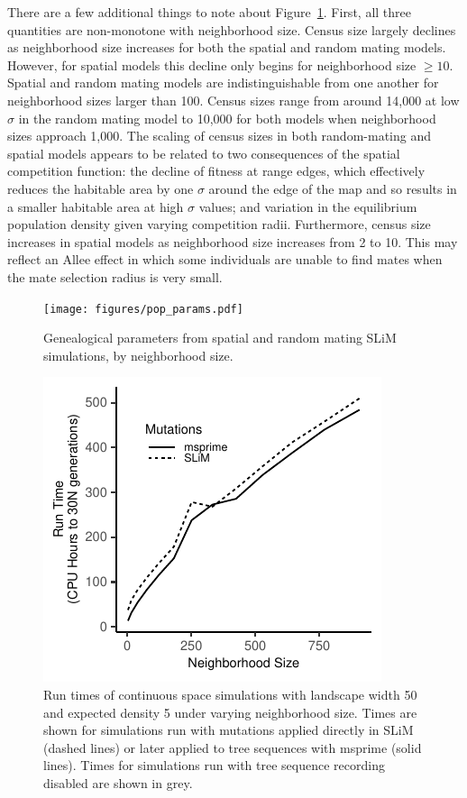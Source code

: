 \documentclass[10pt,twoside,lineno,hidelinks]{preprint}
\begin{document}
There are a few additional things to note about Figure~\ref{fig:genparams}. 
First, all three quantities are non-monotone with neighborhood size. 
Census size largely declines as neighborhood size increases for both the spatial and random mating models. 
However, for spatial models this decline only begins for neighborhood size $\geq 10$. 
Spatial and random mating models are indistinguishable from one another
for neighborhood sizes larger than 100.
Census sizes range from around 14,000 at low $\sigma$ in the random mating model to 10,000 for both models when neighborhood sizes approach 1,000.
The scaling of census sizes in both random-mating and spatial models appears to be related to two consequences of the spatial competition function: the decline of fitness at range edges, which effectively reduces the habitable area by one $\sigma$ around the edge of the map and so results in a smaller habitable area at high $\sigma$ values; and variation in the equilibrium population density given varying competition radii.
Furthermore, census size increases in spatial models as neighborhood size increases from 2 to 10.
This may reflect an Allee effect \citep{Allee1949} in which some individuals are unable to find mates when the mate selection radius is very small.  

\begin{figure}[htbp]
\centering
\texttt{[image: figures/pop\_params.pdf]}
\caption{Genealogical parameters from spatial and random mating SLiM simulations, by neighborhood size.}
\label{fig:genparams}
\end{figure}

\begin{figure}[htbp]
\centering
\includegraphics{figures/runtimes.pdf}
\caption{Run times of continuous space simulations with landscape width 50 and expected density 5 under varying neighborhood size. Times are shown for simulations run with mutations applied directly in SLiM (dashed lines) or later applied to tree sequences with msprime (solid lines). Times for simulations run with tree sequence recording disabled are shown in grey.}
\label{fig:runtimes}
\end{figure}
\end{document}
